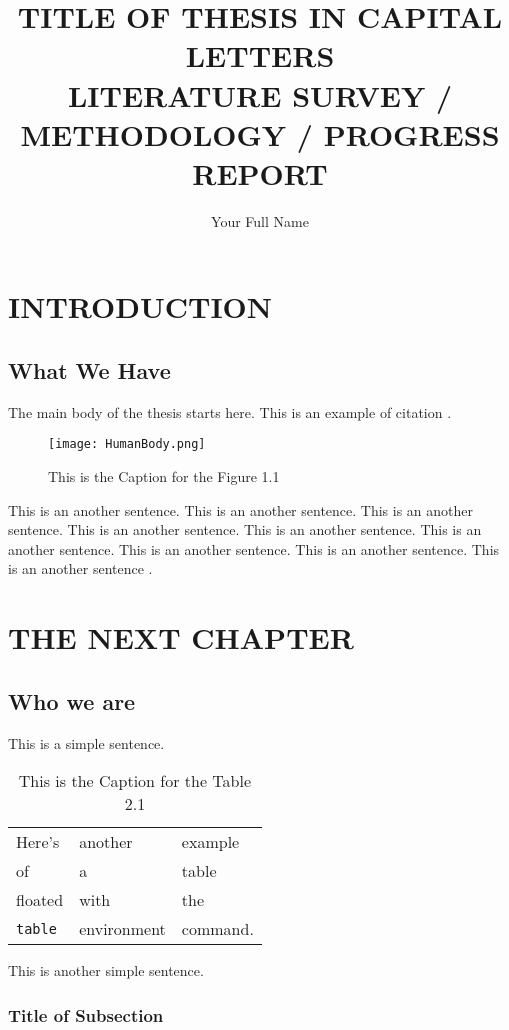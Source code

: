 \documentclass[12pt]{report}
\title{TITLE OF THESIS IN CAPITAL LETTERS \\ LITERATURE SURVEY / METHODOLOGY / PROGRESS REPORT}
\author{Your Full Name}
\begin{document}
\makecstitle

\chapter{INTRODUCTION}

\section{What We Have}
The main body of the thesis starts here.
This is an example of citation \cite{label}.


\begin{figure}[h]
\begin{center}
\texttt{[image: HumanBody.png]}
\caption{This is the Caption for the Figure 1.1}
\end{center}
\end{figure}

This is an another sentence. This is an another sentence. This is an another sentence. This is an another sentence. 
This is an another sentence. This is an another sentence. This is an another sentence. This is an another sentence. 
This is an another sentence \cite{lee}.

\chapter{THE NEXT CHAPTER}
\section{Who we are}

This is a simple sentence.
\begin{table}[h]
\begin{center}
\begin{tabular}{lll}
Here's       & another     & example  \\
of           & a           & table    \\
floated      & with        & the      \\
\verb+table+ & environment & command.
\end{tabular}
\end{center}
\caption{This is the Caption for the Table 2.1}
\end{table}

This is another simple sentence.

\subsection{Title of Subsection}
\end{document}
